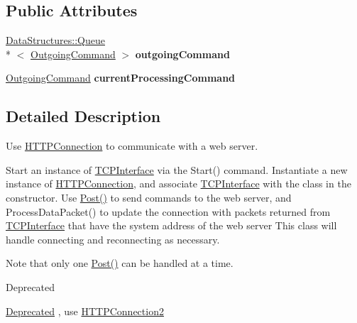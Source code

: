 \subsection*{Public Attributes}
\begin{DoxyCompactItemize}
\item 
\hypertarget{class_rak_net_1_1_h_t_t_p_connection_add319aa1727f6721c5c29d551da2ba2e}{\hyperlink{class_data_structures_1_1_queue}{Data\-Structures\-::\-Queue}\\*
$<$ \hyperlink{struct_rak_net_1_1_h_t_t_p_connection_1_1_outgoing_command}{Outgoing\-Command} $>$ {\bfseries outgoing\-Command}}\label{class_rak_net_1_1_h_t_t_p_connection_add319aa1727f6721c5c29d551da2ba2e}

\item 
\hypertarget{class_rak_net_1_1_h_t_t_p_connection_a27232022c95bb8f72cb41923c235f84b}{\hyperlink{struct_rak_net_1_1_h_t_t_p_connection_1_1_outgoing_command}{Outgoing\-Command} {\bfseries current\-Processing\-Command}}\label{class_rak_net_1_1_h_t_t_p_connection_a27232022c95bb8f72cb41923c235f84b}

\end{DoxyCompactItemize}


\subsection{Detailed Description}
Use \hyperlink{class_rak_net_1_1_h_t_t_p_connection}{H\-T\-T\-P\-Connection} to communicate with a web server. 

Start an instance of \hyperlink{class_rak_net_1_1_t_c_p_interface}{T\-C\-P\-Interface} via the Start() command. Instantiate a new instance of \hyperlink{class_rak_net_1_1_h_t_t_p_connection}{H\-T\-T\-P\-Connection}, and associate \hyperlink{class_rak_net_1_1_t_c_p_interface}{T\-C\-P\-Interface} with the class in the constructor. Use \hyperlink{class_rak_net_1_1_h_t_t_p_connection_ae13eeb1d5063b5bb3e083c9ecd217708}{Post()} to send commands to the web server, and Process\-Data\-Packet() to update the connection with packets returned from \hyperlink{class_rak_net_1_1_t_c_p_interface}{T\-C\-P\-Interface} that have the system address of the web server This class will handle connecting and reconnecting as necessary.

Note that only one \hyperlink{class_rak_net_1_1_h_t_t_p_connection_ae13eeb1d5063b5bb3e083c9ecd217708}{Post()} can be handled at a time. \begin{DoxyRefDesc}{Deprecated}
\item[\hyperlink{deprecated__deprecated000001}{Deprecated}], use \hyperlink{class_rak_net_1_1_h_t_t_p_connection2}{H\-T\-T\-P\-Connection2} \end{DoxyRefDesc}



